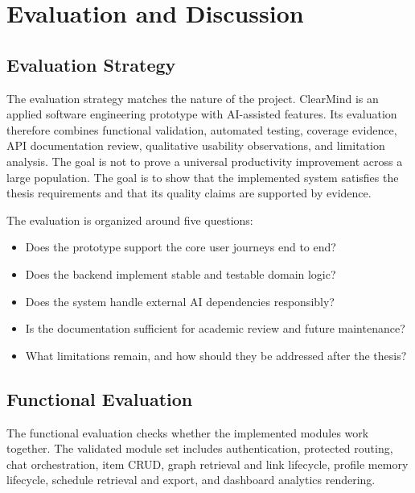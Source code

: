 \chapter{Evaluation and Discussion}

\section{Evaluation Strategy}

The evaluation strategy matches the nature of the project. ClearMind is an applied software engineering prototype with AI-assisted features. Its evaluation therefore combines functional validation, automated testing, coverage evidence, API documentation review, qualitative usability observations, and limitation analysis. The goal is not to prove a universal productivity improvement across a large population. The goal is to show that the implemented system satisfies the thesis requirements and that its quality claims are supported by evidence.

The evaluation is organized around five questions:

\begin{itemize}
  \item Does the prototype support the core user journeys end to end?
  \item Does the backend implement stable and testable domain logic?
  \item Does the system handle external AI dependencies responsibly?
  \item Is the documentation sufficient for academic review and future maintenance?
  \item What limitations remain, and how should they be addressed after the thesis?
\end{itemize}

\section{Functional Evaluation}

The functional evaluation checks whether the implemented modules work together. The validated module set includes authentication, protected routing, chat orchestration, item CRUD, graph retrieval and link lifecycle, profile memory lifecycle, schedule retrieval and export, and dashboard analytics rendering.

